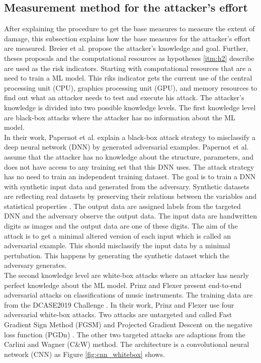\subsection{Measurement method for the attacker's effort}
\label{sec:find_effort}

After explaining the procedure to get the base measures to measure the extent of damage, this subsection explains how the base measures for the attacker's effort are measured. Breier et al. \cite{DBLP:journals/corr/abs-2012-04884} propose the attacker's knowledge and goal. Further, theses proposals and the computational resources as hypotheses \ref{itm:h2} describe are used as the risk indicators. Starting with computational resources that are a need to train a ML model. This riks indicator gets the current use of the central processing unit (CPU), graphics processing unit (GPU), and memory resources to find out what an attacker needs to test and execute his attack. The attacker's knowledge is divided into two possible knowledge levels. The first knowledge level are black-box attacks where the attacker has no information about the ML model. \\
In their work, Papernot et al. \cite{DBLP:conf/ccs/PapernotMGJCS17} explain a black-box attack strategy to misclassify a deep neural network (DNN) \cite{DBLP:journals/spm/X12a} by generated adversarial examples. Papernot et al. assume that the attacker has no knowledge about the structure, parameters, and does not have access to any training set that this DNN uses. The attack strategy has no need to train an independent training dataset. The goal is to train a DNN with synthetic input data and generated from the adversary. Synthetic datasets are reflecting real datasets by preserving their relations between the variables and statistical properties \cite{Quintana2020ASD}. The output data are assigned labels from the targeted DNN and the adversary observe the output data. The input data are handwritten digits as
images and the output data are one of these digits. The aim of the attack is to get a minimal altered version of each input which is called an adversarial example. This should misclassify the input data by a minimal pertubation. This happens by generating the synthetic dataset which the adversary generates.\\
The second knowledge level are white-box attacks where an attacker has nearly perfect knowledge about the ML model. Prinz and Flexer \cite{DBLP:journals/corr/abs-2007-14714} present end-to-end adversarial attacks on classifications of music instruments. The training data are from the DCASE2019 Challenge \cite{DBLP:conf/dcase/FonsecaPFES19}. In their work, Prinz and Flexer use four adversarial white-box attacks. Two attacks are untargeted and called Fast Gradient Sign Method (FGSM) \cite{DBLP:journals/corr/GoodfellowSS14} and Projected Gradient Descent on the negative loss function (PGDn) \cite{DBLP:conf/iclr/MadryMSTV18}. The other two targeted attacks are adaptions from the Carlini and Wagner (C\&W) \cite{DBLP:conf/sp/Carlini018} method. The architecture is a convolutional neural network (CNN) \cite{DBLP:journals/corr/Kim14f} as Figure \ref{fig:cnn_whitebox} shows.

